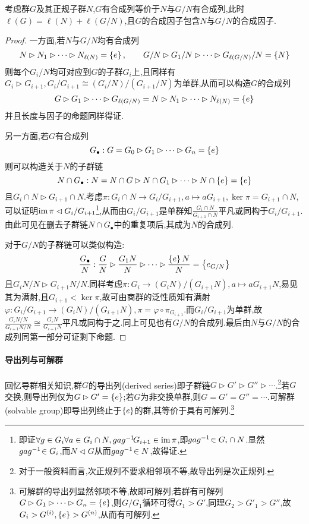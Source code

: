 \documentclass[11pt]{article} %
\begin{document}
考虑群$G$及其正规子群$N$,$G$有合成列等价于$N$与$G/N$有合成列,此时$\ell(G)=\ell(N)+\ell(G/N)$,且$G$的合成因子包含$N$与$G/N$的合成因子.
\begin{proof}
    一方面,若$N$与$G/N$均有合成列
    $$N\rhd N_1 \rhd \cdots \rhd N_{\ell(N)}=\left\{e\right\},\qquad G/N\rhd G_1/N\rhd \cdots \rhd G_{\ell(G/N)}/N=\left\{N\right\}$$
    则每个$G_i/N$均可对应到$G$的子群$G_i$上,且同样有$G_i\rhd G_{i+1}, G_i/G_{i+1}\cong (G_i/N)/(G_{i+1}/N)$为单群,从而可以构造$G$的合成列
    $$G\rhd G_1\rhd \cdots \rhd G_{\ell(G/N)}=N\rhd N_1 \rhd \cdots \rhd N_{\ell(N)}=\left\{e\right\}$$
    并且长度与因子的命题同样得证.

    另一方面,若$G$有合成列
    $$G_\bullet: G=G_0\rhd G_1\rhd\cdots\rhd G_n=\left\{e\right\}$$
    则可以构造关于$N$的子群链
    $$N\cap G_\bullet: N=N\cap G\rhd N\cap G_1\rhd\cdots\rhd N\cap \left\{e\right\}=\left\{e\right\}$$
    且$G_i\cap N\rhd G_{i+1}\cap N$.考虑$\pi:G_i\cap N\to G_i/G_{i+1}, a\mapsto aG_{i+1}, \ker\pi=G_{i+1}\cap N$,可以证明$\operatorname{im}\pi\lhd G_i/G_{i+1}$\footnote{即证$\forall g\in G_i\forall a\in G_i\cap N, gag^{-1}\! G_{i+1}\in \operatorname{im}\pi$,即$gag^{-1}\!\in G_i\cap N$.显然$gag^{-1}\!\in G_i$,而$N\lhd G$从而$gag^{-1}\!\in N$,故得证.},从而由$G_i/G_{i+1}$是单群知$\frac{G_i\cap N}{G_{i+1}\cap N}$平凡或同构于$G_i/G_{i+1}$.由此可见在删去子群链$N\cap G_\bullet$中的重复项后,其成为$N$的合成列.

    对于$G/N$的子群链可以类似构造:
    $$\frac{G_\bullet}{N}: \frac{G}{N}\rhd \frac{G_1N}{N}\rhd\cdots\rhd \frac{\left\{e\right\}N}{N}=\left\{e_{G/N}\right\}$$
    且$G_iN/N\rhd G_{i+1}N/N$.同样考虑$\pi:G_i\to (G_iN)/(G_{i+1}N), a\mapsto aG_{i+1}N$,易见其为满射,且$G_{i+1}<\ker\pi$,故可由商群的泛性质知有满射$\varphi:G_i/G_{i+1}\to (G_iN)/(G_{i+1}N), \pi=\varphi\circ\pi_{G_{i+1}}$.而$G_i/G_{i+1}$为单群,故$\frac{G_iN/N}{G_{i+1}N/N}\cong \frac{G_iN}{G_{i+1}N}$平凡或同构于之.同上可见也有$G/N$的合成列.最后由$N$与$G/N$的合成列同第一部分可证剩下命题.
\end{proof}

\paragraph{导出列与可解群}
回忆导群相关知识,群$G$的导出列(derived series)即子群链$G\rhd G'\rhd G''\rhd \cdots$.\footnote{对于一般资料而言,次正规列不要求相邻项不等,故导出列是次正规列.}若$G$交换,则导出列仅为$G\rhd G'=\left\{e\right\}$;若$G$为非交换单群,则$G=G'=G''=\cdots$.可解群(solvable group)即导出列终止于$\left\{e\right\}$的群,其等价于具有可解列.\footnote{可解群的导出列显然邻项不等,故即可解列;若群有可解列$G\rhd G_1\rhd \cdots \rhd G_n=\left\{e\right\}$,则$G/G_1$循环可得$G_1>G'$,同理$G_2>G'_1>G''$,故$G_i>G^{(i)}, \left\{e\right\}>G^{(n)}$,从而有可解列.}
\end{document}
